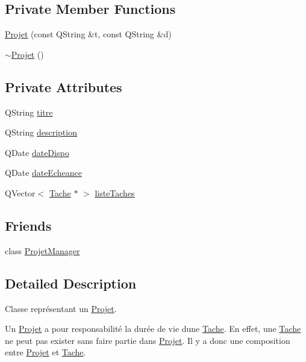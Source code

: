 \subsection*{Private Member Functions}
\begin{DoxyCompactItemize}
\item 
\hyperlink{class_projet_a0149f821f689f5910c7c6d0278d3dd4b}{Projet} (const Q\+String \&t, const Q\+String \&d)
\item 
\hyperlink{class_projet_a26e3e136385eca01dda79df7fba4e03d}{$\sim$\+Projet} ()
\end{DoxyCompactItemize}
\subsection*{Private Attributes}
\begin{DoxyCompactItemize}
\item 
Q\+String \hyperlink{class_projet_a9759849c856c2ac63f94751b876fd289}{titre}
\item 
Q\+String \hyperlink{class_projet_ac2e3a37d5f0201390991b97f258ce0eb}{description}
\item 
Q\+Date \hyperlink{class_projet_a8a89803d629bb571062921008e6a2639}{date\+Dispo}
\item 
Q\+Date \hyperlink{class_projet_a868ee370bb8f071b830dda61f55d99cd}{date\+Echeance}
\item 
Q\+Vector$<$ \hyperlink{class_tache}{Tache} $\ast$ $>$ \hyperlink{class_projet_a268bc6fc9be6d5e266439cc6371cd617}{liste\+Taches}
\end{DoxyCompactItemize}
\subsection*{Friends}
\begin{DoxyCompactItemize}
\item 
class \hyperlink{class_projet_aaaed9857b3481233fa7c581b5c86151d}{Projet\+Manager}
\end{DoxyCompactItemize}


\subsection{Detailed Description}
Classe représentant un \hyperlink{class_projet}{Projet}. 

Un \hyperlink{class_projet}{Projet} a pour responsabilité la durée de vie d\textquotesingle{}une \hyperlink{class_tache}{Tache}. En effet, une \hyperlink{class_tache}{Tache} ne peut pas exister sans faire partie dans \hyperlink{class_projet}{Projet}. Il y a donc une composition entre \hyperlink{class_projet}{Projet} et \hyperlink{class_tache}{Tache}. 

